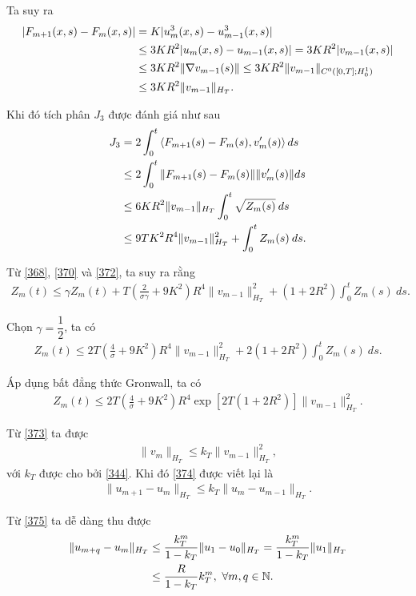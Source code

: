\documentclass[12pt,a4paper]{article}
\def\N{\mathbb{N}}
\theoremstyle{definition}
\theoremstyle{definition}
\begin{document}
Ta suy ra
\begin{align*}
    |F_{m+1}(x,s) - F_m(x,s)|
    &= K|u^3_m(x,s) - u^3_{m-1}(x,s)| \\
    &\le 3KR^2 |u_m(x,s) - u_{m-1}(x,s)| = 3KR^2 |v_{m-1}(x,s)| \notag \\
    &\le 3KR^2 \|\nabla v_{m-1}(s)\| \le 3KR^2 \|v_{m-1}\|_{C^0([0,T];H^1_0)} \notag \\
    &\le 3KR^2 \|v_{m-1}\|_{H_T}. \notag
\end{align*}

Khi đó tích phân $J_3$ được đánh giá như sau
\begin{align} \label{372}
    J_3 &= 2 \int_0^t \left<F_{m+1}(s) - F_m(s), v'_m(s)\right> ds \\
    &\le 2 \int_0^t \|F_{m+1}(s) - F_m(s)\| \|v'_m(s)\| ds \notag \\
    &\le 6KR^2 \|v_{m-1}\|_{H_T} \int_0^t \sqrt{Z_m(s)}\:ds \notag \\
    &\le 9TK^2R^4 \|v_{m-1}\|^2_{H_T} + \int_0^t Z_m(s)\:ds. \notag
\end{align}

Từ \eqref{368}, \eqref{370} và \eqref{372}, ta suy ra rằng
\begin{align*}
    Z_m(t) \le \gamma Z_m(t) + T\left(\frac{2}{\sigma\gamma} + 9K^2\right)R^4 \|v_{m-1}\|^2_{H_T} + (1 + 2R^2) \int_0^t Z_m(s)\:ds.
\end{align*}

Chọn $\gamma = \dfrac{1}{2}$, ta có
\begin{align*}
    Z_m(t) \le 2T\left(\frac{4}{\sigma} + 9K^2\right)R^4 \|v_{m-1}\|^2_{H_T} + 2(1+2R^2) \int_0^t Z_m(s)\:ds.
\end{align*}

Áp dụng bất đẳng thức Gronwall, ta có
\begin{align} \label{373}
    Z_m(t) \le 2T\left(\frac{4}{\sigma} + 9K^2\right)R^4 \exp \left[2T(1+2R^2)\right] \|v_{m-1}\|^2_{H_T}.
\end{align}

Từ \eqref{373} ta được
\begin{align} \label{374}
    \|v_{m}\|_{H_T}\le k_T \|v_{m-1}\|^2_{H_T},
\end{align}
với $k_T$ được cho bởi \eqref{344}. Khi đó \eqref{374} được viết lại là
\begin{align} \label{375}
\|u_{m+1} - u_m\|_{H_T} \le k_T \|u_m - u_{m-1}\|_{H_T}.
\end{align}

Từ \eqref{375} ta dễ dàng thu được
\begin{align}
    \|u_{m+q} - u_m\|_{H_T}
    &\le \frac{k_T^m}{1 - k_T} \|u_1 - u_0\|_{H_T}
    = \frac{k_T^m}{1 - k_T} \|u_1\|_{H_T} \\
    &\le \frac{R}{1-k_T}k_T^m,\ \forall m,q \in \N. \notag
\end{align}
\end{document}

